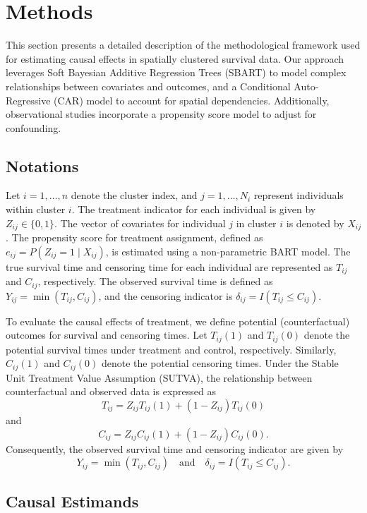 \documentclass[useAMS,referee]{biom}
\begin{document}
\section{Methods}

This section presents a detailed description of the methodological framework used for estimating causal effects in spatially clustered survival data. Our approach leverages Soft Bayesian Additive Regression Trees (SBART) to model complex relationships between covariates and outcomes, and a Conditional Auto-Regressive (CAR) model to account for spatial dependencies. Additionally, observational studies incorporate a propensity score model to adjust for confounding. 

\subsection{Notations}
Let \( i = 1, \ldots, n \) denote the cluster index, and \( j = 1, \ldots, N_i \) represent individuals within cluster \( i \). The treatment indicator for each individual is given by \( Z_{ij} \in \{0, 1\} \). The vector of covariates for individual \( j \) in cluster \( i \) is denoted by \( X_{ij} \). The propensity score for treatment assignment, defined as \( e_{ij} = P(Z_{ij} = 1 \mid X_{ij}) \), is estimated using a non-parametric BART model. The true survival time and censoring time for each individual are represented as \( T_{ij} \) and \( C_{ij} \), respectively. The observed survival time is defined as \( Y_{ij} = \min(T_{ij}, C_{ij}) \), and the censoring indicator is \( \delta_{ij} = I(T_{ij} \leq C_{ij})\).

To evaluate the causal effects of treatment, we define potential (counterfactual) outcomes for survival and censoring times. Let \( T_{ij}(1) \) and \( T_{ij}(0) \) denote the potential survival times under treatment and control, respectively. Similarly, \( C_{ij}(1) \) and \( C_{ij}(0) \) denote the potential censoring times. Under the Stable Unit Treatment Value Assumption (SUTVA), the relationship between counterfactual and observed data is expressed as 
\[
T_{ij} = Z_{ij} T_{ij}(1) + (1 - Z_{ij}) T_{ij}(0)
\]
and 
\[
C_{ij} = Z_{ij} C_{ij}(1) + (1 - Z_{ij}) C_{ij}(0).
\]
Consequently, the observed survival time and censoring indicator are given by 
\[
Y_{ij} = \min(T_{ij}, C_{ij}) \quad \text{and} \quad \delta_{ij} = I(T_{ij} \leq C_{ij}).
\]

\subsection{Causal Estimands}
\end{document}
